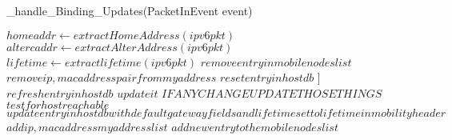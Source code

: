 \documentclass[10pt,a4paper,titlepage]{report}
\begin{document}
		\begin{algorithm}
			\caption{\_handle\_Binding\_Updates(PacketInEvent event)}
			\begin{algorithmic}[1]
				\STATE $homeaddr \leftarrow extractHomeAddress(ipv6pkt)$
				\STATE $altercaddr \leftarrow extractAlterAddress(ipv6pkt)$
				\STATE $lifetime \leftarrow extractlifetime(ipv6pkt)$
					\STATE $remove entry in mobilenodes list$
					\STATE $remove ip, mac address pair from myaddress$
					\STATE $reset entry in hostdb$
				\ELSE 
					]
						\STATE $refresh entry in hostdb$
						\STATE $update it$
						\STATE $IF ANY CHANGE UPDATE THOSE THINGS$
					\ELSE 
						\STATE $test for host reachable$
						\STATE $update entry in hostdb with default gateway fields and lifetime set to life time in mobility header$
						\STATE $add ip, mac address myaddress list$
						\STATE $add new entry to the mobilenodes list$
					\ENDIF 
				\ENDIF
			\end{algorithmic}
		\end{algorithm}
		
\end{document}
